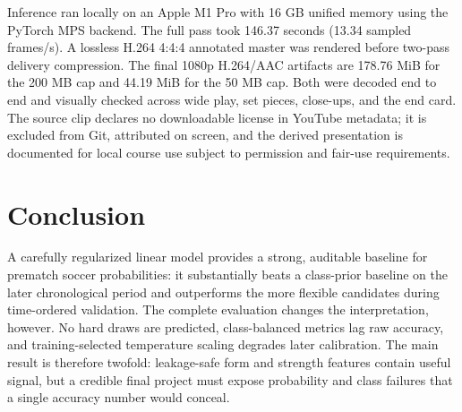 \documentclass[10pt]{article}
\begin{document}
Inference ran locally on an Apple M1 Pro with 16 GB unified memory using the
PyTorch MPS backend. The full pass took 146.37 seconds (13.34 sampled frames/s).
A lossless H.264 4:4:4 annotated master was rendered before two-pass delivery
compression. The final 1080p H.264/AAC artifacts are 178.76 MiB for the 200 MB
cap and 44.19 MiB for the 50 MB cap. Both were decoded end to end and visually
checked across wide play, set pieces, close-ups, and the end card. The source clip
declares no downloadable license in YouTube metadata; it is excluded from Git,
attributed on screen, and the derived presentation is documented for local course
use subject to permission and fair-use requirements.

\section{Conclusion}

A carefully regularized linear model provides a strong, auditable baseline for
prematch soccer probabilities: it substantially beats a class-prior baseline on
the later chronological period and outperforms the more flexible candidates during
time-ordered validation. The complete evaluation changes the interpretation,
however. No hard draws are predicted, class-balanced metrics lag raw accuracy, and
training-selected temperature scaling degrades later calibration. The main result
is therefore twofold: leakage-safe form and strength features contain useful signal,
but a credible final project must expose probability and class failures that a single
accuracy number would conceal.



\end{document}
